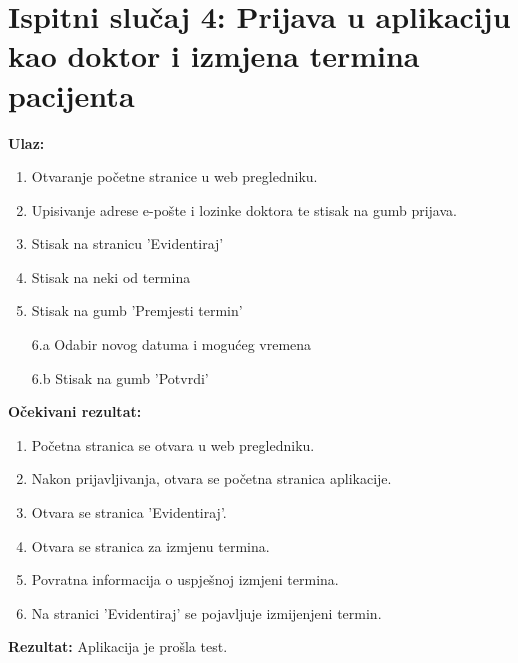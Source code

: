 \section*{Ispitni slučaj 4: Prijava u aplikaciju kao doktor i izmjena termina pacijenta}
\textbf{Ulaz:}
\begin{enumerate}[label=\arabic*.]
    \item Otvaranje početne stranice u web pregledniku.
    \item Upisivanje adrese e-pošte i lozinke doktora te stisak na gumb prijava.
    \item Stisak na stranicu 'Evidentiraj'
    \item Stisak na neki od termina
    \item Stisak na gumb 'Premjesti termin'
    \item[6.a] Odabir novog datuma i mogućeg vremena
    \item[6.b] Stisak na gumb 'Potvrdi'
\end{enumerate}
\textbf{Očekivani rezultat:}
\begin{enumerate}[label=\arabic*.]
    \item Početna stranica se otvara u web pregledniku.
    \item Nakon prijavljivanja, otvara se početna stranica aplikacije.
    \item Otvara se stranica 'Evidentiraj'.
    \item Otvara se stranica za izmjenu termina.
    \item Povratna informacija o uspješnoj izmjeni termina.
    \item Na stranici 'Evidentiraj' se pojavljuje izmijenjeni termin.
\end{enumerate}
\textbf{Rezultat:} Aplikacija je prošla test.


